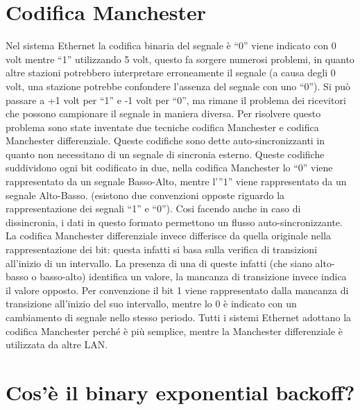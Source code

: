 \section{Codifica Manchester}

Nel sistema Ethernet la codifica binaria del segnale è “0” viene indicato con 0 volt mentre “1” utilizzando 5 volt, questo fa sorgere numerosi problemi, in quanto altre stazioni potrebbero interpretare erroneamente il segnale (a causa degli 0 volt, una stazione potrebbe confondere l’assenza del segnale con uno “0”). Si può passare a +1 volt per “1” e -1 volt per “0”, ma rimane il problema dei ricevitori che possono campionare il segnale in maniera diversa.
Per risolvere questo problema sono state inventate due tecniche codifica Manchester e codifica Manchester differenziale.
Queste codifiche sono dette auto-sincronizzanti in quanto non necessitano di un segnale di sincronia esterno.
Queste codifiche suddividono ogni bit codificato in due, nella codifica Manchester lo “0” viene rappresentato da un segnale Basso-Alto, mentre l’”1” viene rappresentato da un segnale Alto-Basso. (esistono due convenzioni opposte riguardo la rappresentazione dei segnali “1” e “0”).
Cosi facendo anche in caso di dissincronia, i dati in questo formato permettono un flusso auto-sincronizzante.
La codifica Manchester differenziale invece differisce da quella originale nella rappresentazione dei bit: questa infatti si basa sulla verifica di transizioni all’inizio di un intervallo. La presenza di una di queste infatti (che siano alto-basso o basso-alto) identifica un valore, la mancanza di transizione invece indica il valore opposto. Per convenzione il bit 1 viene rappresentato dalla mancanza di transizione all’inizio del suo intervallo, mentre lo 0 è indicato con un cambiamento di segnale nello stesso periodo.
Tutti i sistemi Ethernet adottano la codifica Manchester perché è più semplice, mentre la Manchester differenziale è utilizzata da altre LAN.
 
\section{Cos’è il binary exponential backoff?}

